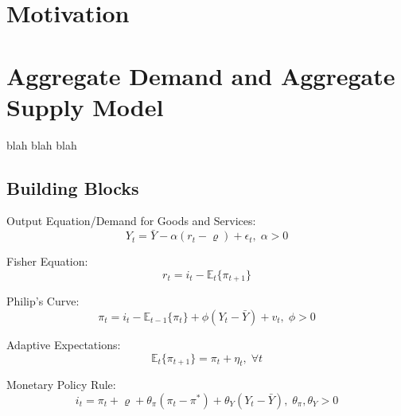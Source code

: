 \documentclass[12pt]{article}
\newcommand{\1}{\mathbbm 1}
\renewcommand{\rho}{\varrho}
\begin{document}
		
		
		\tableofcontents
		
		\newpage{}
		
		\vspace{-8ex}
		
		
		
		
		\section{Motivation}
		
		\newpage
		
		\section{Aggregate Demand and Aggregate Supply Model}
		
		blah blah blah
		
		\subsection{Building Blocks}
		
		Output Equation/Demand for Goods and Services: 
		\begin{equation}
			Y_{t} = \bar{Y} - \alpha (r_{t} - \rho) + \epsilon_{t}, \; \alpha > 0
		\end{equation}
	
	
	Fisher Equation: 
	\begin{equation}
		r_{t} = i_{t} - \mathbb{E}_{t}\{\pi_{t+1}\}
	\end{equation}
		
		Philip's Curve: 
		\begin{equation}
			\pi_{t} = i_{t} - \mathbb{E}_{t-1}\{\pi_{t}\} + \phi(Y_{t} - \bar{Y}) + v_{t}, \; \phi > 0
		\end{equation}
		
		Adaptive Expectations:
		\begin{equation}
			\mathbb{E}_{t}\{\pi_{t+1}\} = \pi_{t} + \eta_{t}, \; \forall t
		\end{equation}
	
	Monetary Policy Rule:
	\begin{equation}
		i_{t} = \pi_{t} + \rho + \theta_{\pi} (\pi_{t} - \pi^{*}) + \theta_{Y} (Y_{t} - \bar{Y}), \; \theta_{\pi}, \theta_{Y} > 0
	\end{equation}
\end{document}
